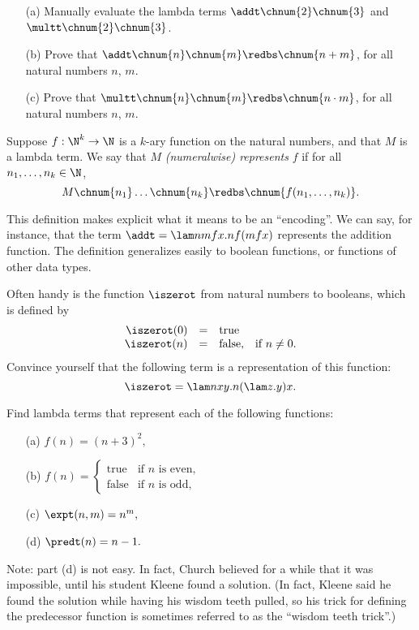 \documentclass[12pt]{article}
\begin{document}
\begin{exercise}
  \begin{enumerate}
  \item[(a)] Manually evaluate the lambda terms
    $\addt\chnum{2}\chnum{3}$ and $\multt\chnum{2}\chnum{3}$.
  \item[(b)] Prove that $\addt\chnum{n}\chnum{m}\redbs\chnum{n+m}$,
    for all natural numbers $n$, $m$.
  \item[(c)] Prove that
    $\multt\chnum{n}\chnum{m}\redbs\chnum{n\cdot m}$, for all natural
    numbers $n$, $m$.
  \end{enumerate}
\end{exercise}

\begin{definition}
  Suppose $f:\N^k\to \N$ is a $k$-ary function on the natural numbers,
  and that $M$ is a lambda term. We say that $M$ {\em (numeralwise)
    represents} $f$ if for all $n_1,\ldots,n_k\in\N$,
  \[ M\chnum{n_1}\ldots\chnum{n_k} \redbs \chnum{f(n_1,\ldots,n_k)}.
  \]
\end{definition}

This definition makes explicit what it means to be an ``encoding''. We
can say, for instance, that the term $\addt = \lam nmfx.nf(mfx)$
represents the addition function.  The definition generalizes easily to
boolean functions, or functions of other data types.

Often handy is the function $\iszerot$ from natural numbers to booleans, which
is defined by
\[ \begin{array}{rcll}
  \iszerot(0) &=& \mbox{true} \\
  \iszerot(n) &=& \mbox{false,} & \mbox{if $n\neq 0$.}
\end{array}
\]
Convince yourself that the following term is a representation of
this function:
\[ \iszerot = \lam nxy.n(\lam z.y)x. \]

\begin{exercise}
  Find lambda terms that represent each of the following functions:
  \begin{enumerate}
  \item[(a)] 
    $ f(n)=(n+3)^2, $
  \item[(b)] 
    $  f(n)=\left\{\begin{array}{ll}\mbox{true}&\mbox{if
          $n$ is even,}\\\mbox{false}&\mbox{if $n$ is odd,}
      \end{array}\right. 
    $
  \item[(c)] 
    $ \expt(n,m)=n^m, $
  \item[(d)] 
    $ \predt(n)=n-1. $
  \end{enumerate}
  Note: part (d) is not easy. In fact, Church believed for a while
  that it was impossible, until his student Kleene found a solution.
  (In fact, Kleene said he found the solution while having his wisdom
  teeth pulled, so his trick for defining the predecessor function is
  sometimes referred to as the ``wisdom teeth trick''.)
\end{exercise}
\end{document}
